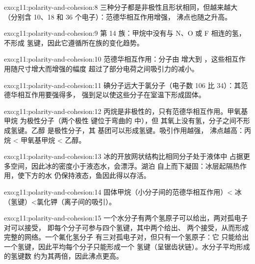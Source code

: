 \begin{solution}{exo:g11:polarity-and-cohesion:8}
三种分子都是非极性且形状相同，但越来越大
（分别含 10、18 和 36 个电子）：范德华相互作用增强，
沸点也随之升高。
\end{solution}

\begin{solution}{exo:g11:polarity-and-cohesion:9}
第 14 族：甲烷中没有与 N、O 或 F 相连的氢，不形成
氢键，因此它遵循所在族的变化趋势。
\end{solution}

\begin{solution}{exo:g11:polarity-and-cohesion:10}
范德华相互作用：分子由  增大到
，这些相互作用随尺寸增大而增强的幅度
超过了部分电荷之间吸引力的减小。
\end{solution}

\begin{solution}{exo:g11:polarity-and-cohesion:11}
碘分子远大于氯分子（电子数 106
比 34）：其范德华相互作用要强得多，
强到足以使这些分子在室温下形成固体。
\end{solution}

\begin{solution}{exo:g11:polarity-and-cohesion:12}
丙烷是非极性的，只有范德华相互作用。甲氧基甲烷
为极性分子（两个极性  键位于弯曲的  中），但
其氧上没有氢，分子之间不形成氢键。乙醇
是极性分子，其  基团可以形成氢键。吸引作用越强，
沸点越高：丙烷 < 甲氧基甲烷
< 乙醇。
\end{solution}

\begin{solution}{exo:g11:polarity-and-cohesion:13}
冰的开放网状结构比相同分子处于液体中
占据更多空间，因此冰的密度小于液态水，会漂浮。湖泊
自上而下凝固：冰层起隔热作用，使下方的水
仍保持液态，鱼因此得以存活。
\end{solution}

\begin{solution}{exo:g11:polarity-and-cohesion:14}
固体甲烷（小分子间的范德华相互作用）<
冰（氢键）<氯化钾（离子间的吸引）。
\end{solution}

\begin{solution}{exo:g11:polarity-and-cohesion:15}
一个水分子有两个氢原子可以给出，两对孤电子对可以接受，
即每个分子可参与四个氢键，其中两个给出、
两个接受，从而形成完整的网络。一个氟化氢分子
有三对孤电子对，但只有一个氢原子：它
只能给出一个氢键，因此平均每个分子只能形成一个
氢键（呈锯齿状链）。水分子平均形成的氢键数
约为其两倍，因此沸点更高。
\end{solution}

